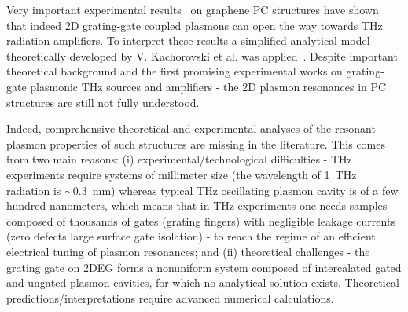 \documentclass[%
 reprint,
 amsmath,amssymb,
 aps,
]{revtex4-2}
\begin{document}
Very important experimental results~\cite{Knap2020} on graphene PC structures have shown that indeed 2D grating-gate coupled plasmons can open the way towards THz radiation amplifiers.
To interpret these results a simplified analytical model theoretically developed by V. Kachorovski et al. was applied~\cite{Kachorovskii2012}. 
Despite important theoretical background and the first promising experimental works on grating-gate plasmonic THz sources and amplifiers - the 2D plasmon resonances in PC structures are still not fully understood.

Indeed, comprehensive theoretical and experimental analyses of the resonant plasmon properties of such structures are missing in the literature.
This comes from two main reasons: 
(i) experimental/technological difficulties - THz experiments require systems of millimeter size (the wavelength of 1~THz radiation is $\sim0.3$~mm) whereas typical THz oscillating plasmon cavity is of a few hundred nanometers, which means that in THz experiments one needs samples composed of thousands of gates (grating fingers) with negligible leakage currents (zero defects large surface gate isolation) - to reach the regime of an efficient electrical tuning of plasmon resonances; and
(ii) theoretical challenges - the grating gate on 2DEG forms a nonuniform system composed of intercalated gated and ungated plasmon cavities, for which no analytical solution exists. Theoretical predictions/interpretations require advanced numerical calculations.

\end{document}
